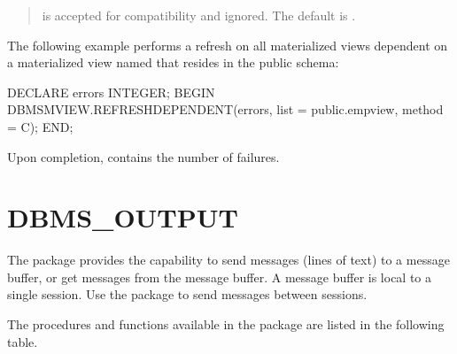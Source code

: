 \documentclass[letterpaper,10pt,english,openany,oneside]{sphinxmanual}
\begin{document}
\begin{quote}

 is accepted for compatibility and ignored. The default is
.
\end{quote}


The following example performs a  refresh on all materialized
views dependent on a materialized view named  that resides in
the public schema:

%
\begin{sphinxVerbatim}[commandchars=\\\{\}]
DECLARE
  errors INTEGER;
BEGIN
  DBMS\PYGZus{}MVIEW.REFRESH\PYGZus{}DEPENDENT(errors, list =\PYGZgt{} \PYGZsq{}public.emp\PYGZus{}view\PYGZsq{},
  method =\PYGZgt{}
\PYGZsq{}C\PYGZsq{});
END;
\end{sphinxVerbatim}

Upon completion,  contains the number of failures.

\newpage


\section{DBMS\_OUTPUT}
\label{\detokenize{dbms_output::doc}}\label{\detokenize{dbms_output:dbms-output}}
The  package provides the capability to send messages (lines
of text) to a message buffer, or get messages from the message buffer. A
message buffer is local to a single session. Use the  package
to send messages between sessions.

The procedures and functions available in the  package are
listed in the following table.
\end{document}
